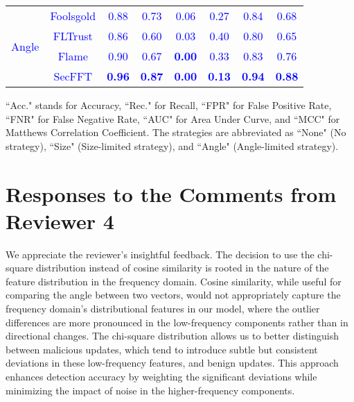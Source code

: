 \documentclass[a4paper,twoside,11pt,dvipsnames]{reviewresponse}
\begin{document}
\begin{table}[h!]
{\begin{tabular}{c|c|c|c|c|c|c|c}
\multirow{4}{*}{\textcolor{blue}{Angle}} & \textcolor{blue}{Foolsgold} & \textcolor{blue}{0.88} & \textcolor{blue}{0.73} & \textcolor{blue}{0.06} & \textcolor{blue}{0.27} & \textcolor{blue}{0.84} & \textcolor{blue}{0.68} \\ 
                       & \textcolor{blue}{FLTrust}   & \textcolor{blue}{0.86} & \textcolor{blue}{0.60} & \textcolor{blue}{0.03} & \textcolor{blue}{0.40} & \textcolor{blue}{0.80} & \textcolor{blue}{0.65} \\ 
                       & \textcolor{blue}{Flame}     & \textcolor{blue}{0.90} & \textcolor{blue}{0.67} & \textbf{\textcolor{blue}{0.00}} & \textcolor{blue}{0.33} & \textcolor{blue}{0.83} & \textcolor{blue}{0.76} \\ 
                       & \textcolor{blue}{SecFFT}    & \textbf{\textcolor{blue}{0.96}} & \textbf{\textcolor{blue}{0.87}} & \textbf{\textcolor{blue}{0.00}} & \textbf{\textcolor{blue}{0.13}} & \textbf{\textcolor{blue}{0.94}} & \textbf{\textcolor{blue}{0.88}} \\ \hline
\end{tabular}
}
\vspace{1em}
\begin{tablenotes}
\scriptsize
\item ``Acc." stands for Accuracy, ``Rec." for Recall, ``FPR" for False Positive Rate, ``FNR" for False Negative Rate, ``AUC" for Area Under Curve, and ``MCC" for Matthews Correlation Coefficient. The strategies are abbreviated as ``None" (No strategy), ``Size" (Size-limited strategy), and ``Angle" (Angle-limited strategy).
\end{tablenotes}
\label{tab:detect}
\end{table}

\newpage

\section{Responses to the Comments from Reviewer 4}


We appreciate the reviewer’s insightful feedback. The decision to use the chi-square distribution instead of cosine similarity is rooted in the nature of the feature distribution in the frequency domain. Cosine similarity, while useful for comparing the angle between two vectors, would not appropriately capture the frequency domain’s distributional features in our model, where the outlier differences are more pronounced in the low-frequency components rather than in directional changes. The chi-square distribution allows us to better distinguish between malicious updates, which tend to introduce subtle but consistent deviations in these low-frequency features, and benign updates. This approach enhances detection accuracy by weighting the significant deviations while minimizing the impact of noise in the higher-frequency components. 
\end{document}
